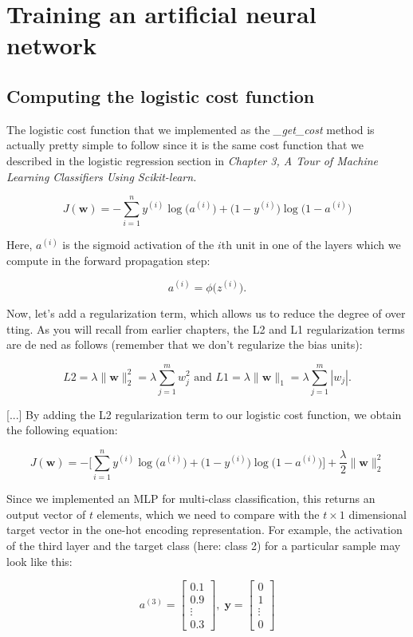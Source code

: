 \documentclass[letterpaper]{report}
\begin{document}
\section{Training an artificial neural network}

\subsection{Computing the logistic cost function}

The logistic cost function that we implemented as the \textit{\_get\_cost} method is actually pretty simple to follow since it is the same cost function that we described in the logistic regression section in \textit{Chapter 3, A Tour of Machine Learning Classifiers Using Scikit-learn.}

\[
J(\mathbf{w}) = -\sum_{i=1}^{n} y^{(i)} \log \big( a^{(i)} \big) + \big( 1 - y^{(i)} \big) \log \big( 1 - a^{(i)}\big)
\]

Here, $a^{(i)}$ is the sigmoid activation of the $i$th unit in one of the layers which we compute in the forward propagation step:

\[
a^{(i)} = \phi \big( z^{(i)} \big).
\]

Now, let's add a regularization term, which allows us to reduce the degree of over tting. As you will recall from earlier chapters, the L2 and L1 regularization terms are de ned as follows (remember that we don't regularize the bias units):

\[
L2 = \lambda \lVert  \mathbf{w} \rVert^{2}_{2} = \lambda \sum_{j=1}^{m} w_{j}^{2} \text{ and } L1 = \lambda \lVert  \mathbf{w} \rVert_{1} = \lambda \sum_{j=1}^{m} | w_j |.
\]

[...] By adding the L2 regularization term to our logistic cost function, we obtain the following equation:

\[
J(\mathbf{w}) = - \Bigg[ \sum_{i=1}^{n} y^{(i)} \log \big( a^{(i)} \big) + \big(1 - y^{(i)} \big) \log \big(1- a^{(i)} \big) \Bigg] + \frac{\lambda}{2} \lVert  \mathbf{w} \rVert^{2}_{2}
\]

Since we implemented an MLP for multi-class classification, this returns an output vector of $t$ elements, which we need to compare with the $t \times 1$ dimensional target vector in the one-hot encoding representation. For example, the activation of the third layer and the target class (here: class 2) for a particular sample may look like this:

\[
a^{(3)} = 
\begin{bmatrix}
0.1 \\
0.9 \\
\vdots \\
0.3
\end{bmatrix}
 ,\; \mathbf{y} = 
 \begin{bmatrix}
0 \\
1 \\
\vdots \\
0
\end{bmatrix}
\]
\end{document}

